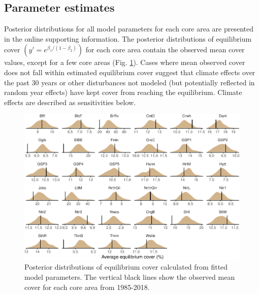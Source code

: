 \documentclass[
  12pt,
]{article}
\begin{document}
\hypertarget{parameter-estimates}{%
\subsection{Parameter estimates}\label{parameter-estimates}}

Posterior distributions for all model parameters for each core area are presented in the online supporting information.
The posterior distributions of equilibrium cover \(\left(y' = e^{\beta_1 / \left(1 - \beta_2 \right)}\right)\) for each core area contain the observed mean cover values, except for a few core areas (Fig. \ref{fig:equilibrium-cover}).
Cases where mean observed cover does not fall within estimated equilibrium cover suggest that climate effects over the past 30 years or other disturbances not modeled (but potentially reflected in random year effects) have kept cover from reaching the equilibrium.
Climate effects are described as sensitivities below.

\begin{figure}
\centering
\includegraphics{sageCastManuscript_files/figure-latex/equilibrium-cover-1.pdf}
\caption{\label{fig:equilibrium-cover}Posterior distributions of equilibrium cover calculated from fitted model parameters. The vertical black lines show the observed mean cover for each core area from 1985-2018.}
\end{figure}
\end{document}
